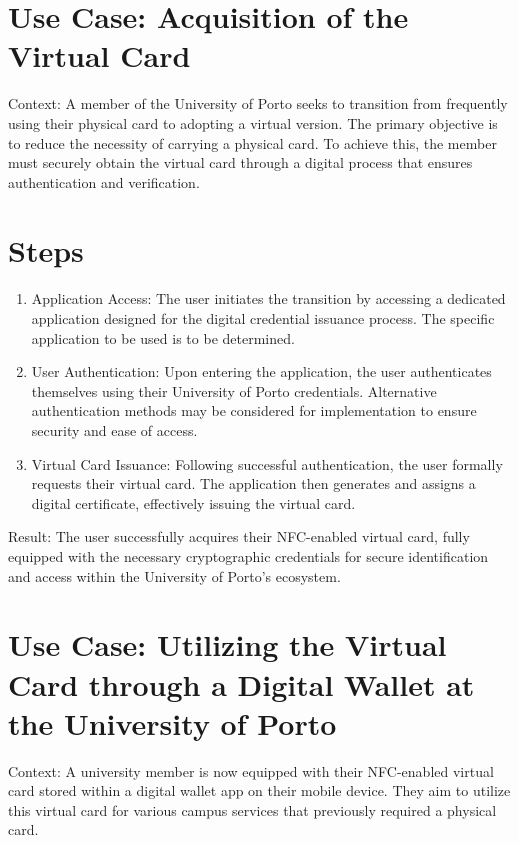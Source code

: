 \documentclass[10pt]{article}
\begin{document}
\section*{Use Case: Acquisition of the Virtual Card}
Context: A member of the University of Porto seeks to transition from frequently using their physical card to adopting a virtual version. The primary objective is to reduce the necessity of carrying a physical card. To achieve this, the member must securely obtain the virtual card through a digital process that ensures authentication and verification.

\section*{Steps}
\begin{enumerate}
  \item Application Access: The user initiates the transition by accessing a dedicated application designed for the digital credential issuance process. The specific application to be used is to be determined.

  \item User Authentication: Upon entering the application, the user authenticates themselves using their University of Porto credentials. Alternative authentication methods may be considered for implementation to ensure security and ease of access.

  \item Virtual Card Issuance: Following successful authentication, the user formally requests their virtual card. The application then generates and assigns a digital certificate, effectively issuing the virtual card.

\end{enumerate}

Result: The user successfully acquires their NFC-enabled virtual card, fully equipped with the necessary cryptographic credentials for secure identification and access within the University of Porto's ecosystem.

\section*{Use Case: Utilizing the Virtual Card through a Digital Wallet at the University of Porto}
Context: A university member is now equipped with their NFC-enabled virtual card stored within a digital wallet app on their mobile device. They aim to utilize this virtual card for various campus services that previously required a physical card.
\end{document}
